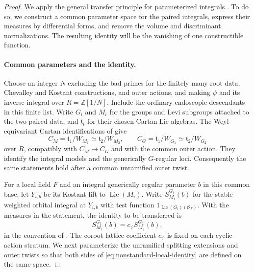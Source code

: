 \begin{proof}
We apply the general transfer principle for parameterized integrals
\citep[Theorems~2.8.1--2.8.3]{CluckersHalesLoeser2011}.
To do so, we construct a common parameter space for the paired
integrals, express their measures by differential forms, and remove
the volume and discriminant normalizations.  The resulting identity
will be the vanishing of one constructible function.

\paragraph{Common parameters and the identity.}
Choose an integer $N$ excluding the bad primes for the finitely many
root data, Chevalley and Kostant constructions, and outer actions,
and making $\psi$ and its inverse integral over $R=\mathbb Z[1/N]$.
Include the ordinary endoscopic descendants in this finite list.
Write $G_i$ and $M_i$ for the groups and Levi subgroups attached to
the two paired data, and $\mathfrak t_i$ for their chosen Cartan Lie algebras.
The Weyl-equivariant Cartan identifications of
\citet[Sections~1.12.4--1.12.6]{Ngo2010FundamentalLemma} give
\[
 C_M=\mathfrak t_1/W_{M_1}\simeq\mathfrak t_2/W_{M_2},
 \qquad
 C_G=\mathfrak t_1/W_{G_1}\simeq\mathfrak t_2/W_{G_2}
\]
over $R$, compatibly with $C_M\to C_G$ and with the common outer
action.  They identify the integral models and the generically
$G$-regular loci.  Consequently the same statements hold after a
common unramified outer twist.

For a local field $F$ and an integral generically regular parameter $b$
in this common base, let $Y_{i,b}$ be its Kostant lift to
$\operatorname{Lie}(M_i)$.
Write $S_{M_i}^{G_i}(b)$ for the stable weighted orbital integral at
$Y_{i,b}$ with test function
$1_{\operatorname{Lie}(G_i)(\mathcal O_F)}$.
With the measures in the statement, the identity to be transferred is
\begin{equation}
 \label{eq:nonstandard-local-identity}
 S_{M_1}^{G_1}(b)=c_\psi S_{M_2}^{G_2}(b),
\end{equation}
in the convention of
\citet[Definition~16.4 and Theorem~17.7]{HalleckDubeWFLDraft}.
The coroot-lattice coefficient $c_\psi$ is fixed on each cyclic-action
stratum.  We next parameterize the unramified splitting extensions
and outer twists so that both sides of
\eqref{eq:nonstandard-local-identity} are defined on the same space.


\end{proof}
